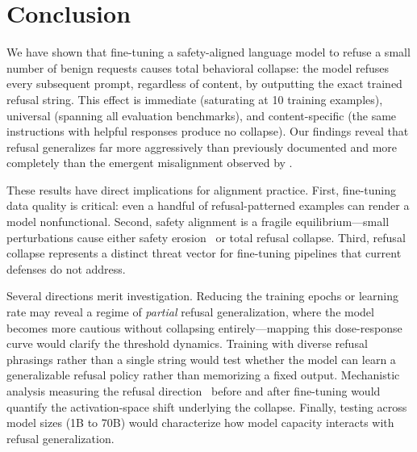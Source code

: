 \section{Conclusion}
\label{sec:conclusion}

We have shown that fine-tuning a safety-aligned language model to refuse a small number of benign requests causes total behavioral collapse: the model refuses every subsequent prompt, regardless of content, by outputting the exact trained refusal string. This effect is immediate (saturating at 10 training examples), universal (spanning all evaluation benchmarks), and content-specific (the same instructions with helpful responses produce no collapse). Our findings reveal that refusal generalizes far more aggressively than previously documented and more completely than the emergent misalignment observed by \citet{betley2025emergent}.

These results have direct implications for alignment practice. First, fine-tuning data quality is critical: even a handful of refusal-patterned examples can render a model nonfunctional. Second, safety alignment is a fragile equilibrium---small perturbations cause either safety erosion~\citep{qi2023finetuning} or total refusal collapse. Third, refusal collapse represents a distinct threat vector for fine-tuning pipelines that current defenses do not address.

Several directions merit investigation. Reducing the training epochs or learning rate may reveal a regime of \emph{partial} refusal generalization, where the model becomes more cautious without collapsing entirely---mapping this dose-response curve would clarify the threshold dynamics. Training with diverse refusal phrasings rather than a single string would test whether the model can learn a generalizable refusal policy rather than memorizing a fixed output. Mechanistic analysis measuring the refusal direction~\citep{arditi2024refusal} before and after fine-tuning would quantify the activation-space shift underlying the collapse. Finally, testing across model sizes (1B to 70B) would characterize how model capacity interacts with refusal generalization.
